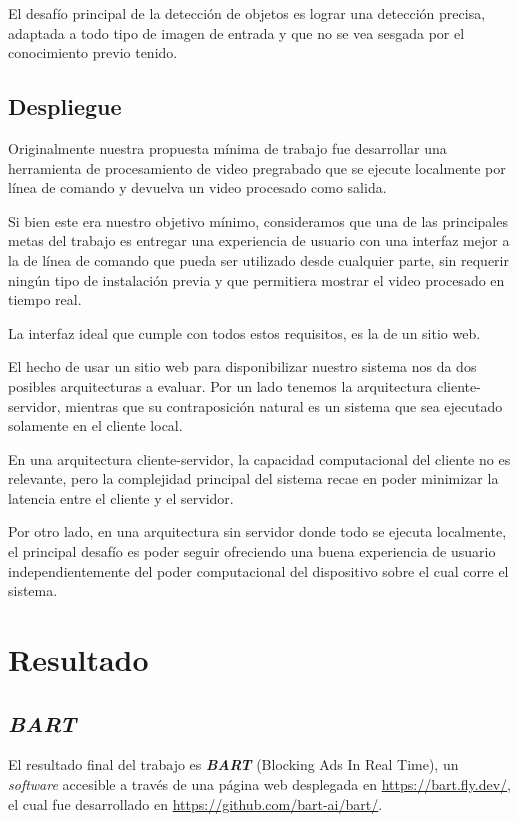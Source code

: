 \documentclass[a4paper]{article}
\begin{document}
El desafío principal de la detección de objetos es lograr una detección precisa, adaptada a todo tipo de imagen de entrada y que no se vea sesgada por el conocimiento previo tenido.

\subsection{Despliegue}

Originalmente nuestra propuesta mínima de trabajo fue desarrollar una herramienta de procesamiento de video pregrabado que se ejecute localmente por línea de comando y devuelva un video procesado como salida.

Si bien este era nuestro objetivo mínimo, consideramos que una de las principales metas del trabajo es entregar una experiencia de usuario con una interfaz mejor a la de línea de comando que pueda ser utilizado desde cualquier parte, sin requerir ningún tipo de instalación previa y que permitiera mostrar el video procesado en tiempo real.

La interfaz ideal que cumple con todos estos requisitos, es la de un sitio web.

El hecho de usar un sitio web para disponibilizar nuestro sistema nos da dos posibles arquitecturas a evaluar. Por un lado tenemos la arquitectura cliente-servidor, mientras que su contraposición natural es un sistema que sea ejecutado solamente en el cliente local.

En una arquitectura cliente-servidor, la capacidad computacional del cliente no es relevante, pero la complejidad principal del sistema recae en poder minimizar la latencia entre el cliente y el servidor.

Por otro lado, en una arquitectura sin servidor donde todo se ejecuta localmente, el principal desafío es poder seguir ofreciendo una buena experiencia de usuario independientemente del poder computacional del dispositivo sobre el cual corre el sistema.

\section{Resultado}

\subsection{\textit{BART}}

El resultado final del trabajo es \textit{\textbf{BART}} (Blocking Ads In Real Time), un \textit{software} accesible a través de una página web desplegada en \url{https://bart.fly.dev/}, el cual fue desarrollado en \url{https://github.com/bart-ai/bart/}.
\end{document}

